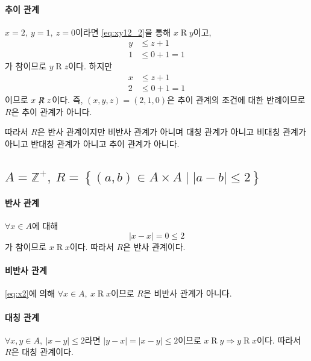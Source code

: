 \documentclass{oblivoir}
\begin{document}
\paragraph{추이 관계}
$x = 2,\ y = 1,\ z = 0$이라면
\eqref{eq:xy12_2}을 통해 $x \mathrel R y$이고,
\begin{equation}
    \begin{aligned}
        y &\leq z + 1 \\
        1 &\leq 0 + 1 = 1
    \end{aligned}
\end{equation}
가 참이므로 $y \mathrel R z$이다.
하지만
\begin{equation}
    \begin{aligned}
        x &\leq z + 1 \\
        2 &\leq 0 + 1 = 1
    \end{aligned}
\end{equation}
이므로 $x \not \mathrel R z$이다.
즉, $(x,y,z) = (2,1,0)$은 추이 관계의 조건에 대한 반례이므로
$R$은 추이 관계가 아니다.

따라서 $R$은 반사 관계이지만 비반사 관계가 아니며
대칭 관계가 아니고 비대칭 관계가 아니고 반대칭 관계가 아니고
추이 관계가 아니다.

\subsection{$A = \mathbb Z^+,\ R = \left\{ (a,b) \in A \times A \mid |a-b| \leq 2 \right\}$}

\paragraph{반사 관계}
$\forall x \in A$에 대해
\begin{equation}\label{eq:x2}
    |x - x| = 0 \leq 2
\end{equation}
가 참이므로 $x \mathrel R x$이다.
따라서 $R$은 반사 관계이다.

\paragraph{비반사 관계}
\eqref{eq:x2}에 의해 $\forall x \in A,\ x \mathrel R x$이므로
$R$은 비반사 관계가 아니다.

\paragraph{대칭 관계}
$\forall x, y \in A,\ |x-y| \leq 2$라면 $|y-x| = |x - y| \leq 2$이므로
$x \mathrel R y \Rightarrow y \mathrel R x$이다.
따라서 $R$은 대칭 관계이다.
\end{document}
